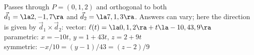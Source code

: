 {Passes through $P=(0,1,2)$ and orthogonal to both\\ $\vec d_1=\la 2,-1,7\ra$ and $\vec d_2=\la 7,1,3\ra$.
}
{Answers can vary; here the direction is given by $\vec d_1\times \vec d_2$:
vector: $\ell(t) = \la 0,1,2\ra + t\la -10,43,9\ra$\\
parametric: $x= -10t$, $y=1+43t$, $z = 2+9t$\\
symmetric: $-x/10 =(y-1)/43 = (z-2)/9$
}

